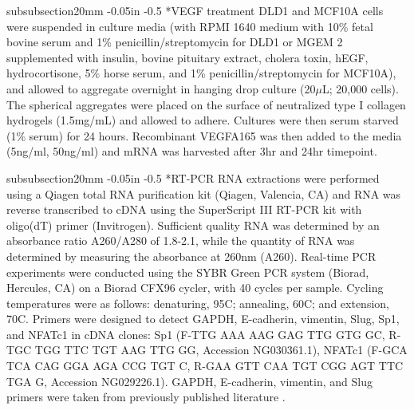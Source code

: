 \documentclass[12pt]{article}
\makeatletter
\renewcommand\subsubsection{\@startsection
	{subsubsection}{2}{0mm}
	{-0.05in}
	{-0.5\baselineskip}
	{\normalfont\normalsize\itshape}}
\makeatother
\begin{document}
\subsubsection*{VEGF treatment}
DLD1 and MCF10A cells were suspended in culture media (with RPMI 1640 medium with 10\% fetal bovine serum and 1\% penicillin/streptomycin for DLD1 or MGEM 2 supplemented with insulin, bovine pituitary extract, cholera toxin, hEGF, hydrocortisone, 5\% horse serum, and 1\% penicillin/streptomycin for MCF10A), and allowed to aggregate overnight in hanging drop culture (20$\mu$L; 20,000 cells).  The spherical aggregates were placed on the surface of neutralized type I collagen hydrogels (1.5mg/mL) and allowed to adhere.  Cultures were then serum starved (1\% serum) for 24 hours.  Recombinant VEGFA165 was then added to the media (5ng/ml, 50ng/ml) and mRNA was harvested after 3hr and 24hr timepoint.

\subsubsection*{RT-PCR}
RNA extractions were performed using a Qiagen total RNA purification kit (Qiagen, Valencia, CA) and RNA was reverse transcribed to cDNA using the SuperScript III RT-PCR kit with oligo(dT) primer (Invitrogen).  Sufficient quality RNA was determined by an absorbance ratio A260/A280 of 1.8-2.1, while the quantity of RNA was determined by measuring the absorbance at 260nm (A260).  Real-time PCR experiments were conducted using the SYBR Green PCR system (Biorad, Hercules, CA) on a Biorad CFX96 cycler, with 40 cycles per sample. Cycling temperatures were as follows: denaturing, 95C; annealing, 60C; and extension, 70C.  Primers were designed to detect GAPDH, E-cadherin, vimentin, Slug, Sp1, and NFATc1 in cDNA clones: Sp1 (F-TTG AAA AAG GAG TTG GTG GC, R-TGC TGG TTC TGT AAG TTG GG, Accession NG030361.1), NFATc1 (F-GCA TCA CAG GGA AGA CCG TGT C, R-GAA GTT CAA TGT CGG AGT TTC TGA G, Accession  NG029226.1).  GAPDH, E-cadherin, vimentin, and Slug primers were taken from previously published literature \citep{Medici:2008fk}.
\end{document}
